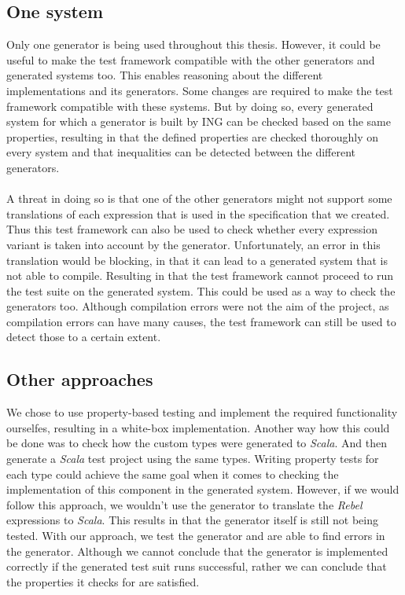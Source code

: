 \subsection*{One system}
Only one generator is being used throughout this thesis. However, it could be useful to make the test framework compatible with the other generators and generated systems too. This enables reasoning about the different implementations and its generators. Some changes are required to make the test framework compatible with these systems. But by doing so, every generated system for which a generator is built by ING can be checked based on the same properties, resulting in that the defined properties are checked thoroughly on every system and that inequalities can be detected between the different generators.\\
\\
A threat in doing so is that one of the other generators might not support some translations of each expression that is used in the specification that we created. Thus this test framework can also be used to check whether every expression variant is taken into account by the generator. Unfortunately, an error in this translation would be blocking, in that it can lead to a generated system that is not able to compile. Resulting in that the test framework cannot proceed to run the test suite on the generated system. This could be used as a way to check the generators too. Although compilation errors were not the aim of the project, as compilation errors can have many causes, the test framework can still be used to detect those to a certain extent.

\subsection*{Other approaches}
We chose to use property-based testing and implement the required functionality ourselfes, resulting in a white-box implementation. Another way how this could be done was to check how the custom types were generated to \textit{Scala}. And then generate a \textit{Scala} test project using the same types. Writing property tests for each type could achieve the same goal when it comes to checking the implementation of this component in the generated system. However, if we would follow this approach, we wouldn't use the generator to translate the \textit{Rebel} expressions to \textit{Scala}. This results in that the generator itself is still not being tested. With our approach, we test the generator and are able to find errors in the generator. Although we cannot conclude that the generator is implemented correctly if the generated test suit runs successful, rather we can conclude that the properties it checks for are satisfied.
